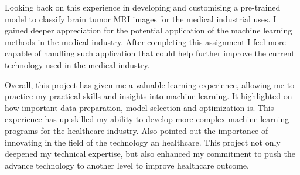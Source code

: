 Looking back on this experience in developing and customising a pre-trained model to classify brain tumor MRI images for the medical industrial uses. I gained deeper appreciation for the potential application of the machine learning methods in the medical industry. After completing this assignment I feel more capable of handling such application that could help further improve the current technology used in the medical industry.

Overall, this project has given me a valuable learning experience, allowing me to practice my practical skills and insights into machine learning. It highlighted on how important data preparation, model selection and optimization is. This experience has up skilled my ability to develop more complex machine learning programs for the healthcare industry. Also pointed out the importance of innovating in the field of the technology an healthcare. This project not only deepened my technical expertise, but also enhanced my commitment to push the advance technology to another level to improve healthcare outcome.
